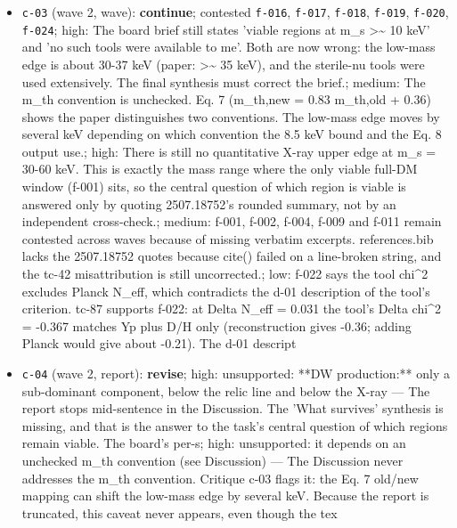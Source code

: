 \documentclass[11pt,a4paper]{article}
\begin{document}
\begin{itemize}
  \item \texttt{c-03} (wave 2, wave): \textbf{continue}; contested \texttt{f-016}, \texttt{f-017}, \texttt{f-018}, \texttt{f-019}, \texttt{f-020}, \texttt{f-024}; high: The board brief still states 'viable regions at m\_s \textgreater{}\textasciitilde{} 10 keV' and 'no such tools were available to me'. Both are now wrong: the low-mass edge is about 30-37 keV (paper: \textgreater{}\textasciitilde{} 35 keV), and the sterile-nu tools were used extensively. The final synthesis must correct the brief.; medium: The m\_th convention is unchecked. Eq. 7 (m\_th,new = 0.83 m\_th,old + 0.36) shows the paper distinguishes two conventions. The low-mass edge moves by several keV depending on which convention the 8.5 keV bound and the Eq. 8 output use.; high: There is still no quantitative X-ray upper edge at m\_s = 30-60 keV. This is exactly the mass range where the only viable full-DM window (f-001) sits, so the central question of which region is viable is answered only by quoting 2507.18752's rounded summary, not by an independent cross-check.; medium: f-001, f-002, f-004, f-009 and f-011 remain contested across waves because of missing verbatim excerpts. references.bib lacks the 2507.18752 quotes because cite() failed on a line-broken string, and the tc-42 misattribution is still uncorrected.; low: f-022 says the tool chi\textasciicircum{}2 excludes Planck N\_eff, which contradicts the d-01 description of the tool's criterion. tc-87 supports f-022: at Delta N\_eff = 0.031 the tool's Delta chi\textasciicircum{}2 = -0.367 matches Yp plus D/H only (reconstruction gives -0.36; adding Planck would give about -0.21). The d-01 descript
  \item \texttt{c-04} (wave 2, report): \textbf{revise}; high: unsupported: **DW production:** only a sub-dominant component, below the relic line and below the X-ray --- The report stops mid-sentence in the Discussion. The 'What survives' synthesis is missing, and that is the answer to the task's central question of which regions remain viable. The board's per-s; high: unsupported: it depends on an unchecked m\_th convention (see Discussion) --- The Discussion never addresses the m\_th convention. Critique c-03 flags it: the Eq. 7 old/new mapping can shift the low-mass edge by several keV. Because the report is truncated, this caveat never appears, even though the tex
\end{itemize}
\end{document}
